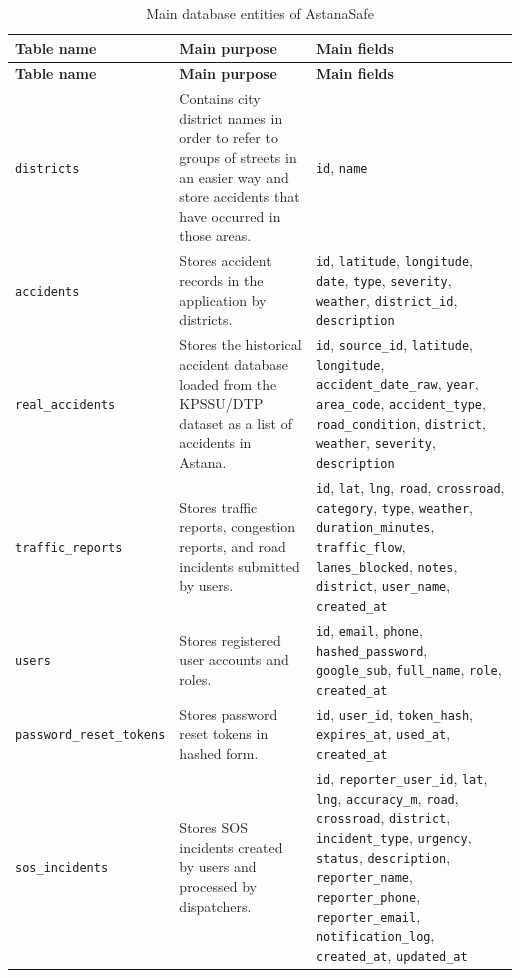 ﻿\documentclass[12pt,a4paper]{report}
\begin{document}
\renewcommand{\arraystretch}{1.2}
\begin{longtable}{|p{3cm}|p{4.6cm}|p{7.1cm}|}
\caption{\centering Main database entities of AstanaSafe}
\label{tab:database_entities} \\
\hline
\textbf{Table name} & \textbf{Main purpose} & \textbf{Main fields} \\
\hline
\endfirsthead
\hline
\textbf{Table name} & \textbf{Main purpose} & \textbf{Main fields} \\
\hline
\endhead
\texttt{districts} & Contains city district names in order to refer to groups of streets in an easier way and store accidents that have occurred in those areas. & \texttt{id}, \texttt{name} \\
\hline
\texttt{accidents} & Stores accident records in the application by districts. & \texttt{id}, \texttt{latitude}, \texttt{longitude}, \texttt{date}, \texttt{type}, \texttt{severity}, \texttt{weather}, \texttt{district\_id}, \texttt{description} \\
\hline
\texttt{real\_accidents} & Stores the historical accident database loaded from the KPSSU/DTP dataset as a list of accidents in Astana. & \texttt{id}, \texttt{source\_id}, \texttt{latitude}, \texttt{longitude}, \texttt{accident\_date\_raw}, \texttt{year}, \texttt{area\_code}, \texttt{accident\_type}, \texttt{road\_condition}, \texttt{district}, \texttt{weather}, \texttt{severity}, \texttt{description} \\
\hline
\texttt{traffic\_reports} & Stores traffic reports, congestion reports, and road incidents submitted by users. & \texttt{id}, \texttt{lat}, \texttt{lng}, \texttt{road}, \texttt{crossroad}, \texttt{category}, \texttt{type}, \texttt{weather}, \texttt{duration\_minutes}, \texttt{traffic\_flow}, \texttt{lanes\_blocked}, \texttt{notes}, \texttt{district}, \texttt{user\_name}, \texttt{created\_at} \\
\hline
\texttt{users} & Stores registered user accounts and roles. & \texttt{id}, \texttt{email}, \texttt{phone}, \texttt{hashed\_password}, \texttt{google\_sub}, \texttt{full\_name}, \texttt{role}, \texttt{created\_at} \\
\hline
\texttt{password\_reset\_tokens} & Stores password reset tokens in hashed form. & \texttt{id}, \texttt{user\_id}, \texttt{token\_hash}, \texttt{expires\_at}, \texttt{used\_at}, \texttt{created\_at} \\
\hline
\texttt{sos\_incidents} & Stores SOS incidents created by users and processed by dispatchers. & \texttt{id}, \texttt{reporter\_user\_id}, \texttt{lat}, \texttt{lng}, \texttt{accuracy\_m}, \texttt{road}, \texttt{crossroad}, \texttt{district}, \texttt{incident\_type}, \texttt{urgency}, \texttt{status}, \texttt{description}, \texttt{reporter\_name}, \texttt{reporter\_phone}, \texttt{reporter\_email}, \texttt{notification\_log}, \texttt{created\_at}, \texttt{updated\_at} \\
\hline
\end{longtable}
\end{document}
